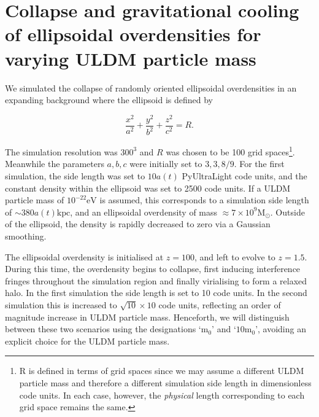 \documentclass[a4paper,11pt]{article}
\begin{document}
\section{Collapse and gravitational cooling of ellipsoidal overdensities for varying ULDM particle mass}\label{sec:collapse}

We simulated the collapse of randomly oriented ellipsoidal overdensities in an expanding background where the ellipsoid is defined by

\begin{equation}\label{eq:ellipse}
    \frac{x^2}{a^2}+\frac{y^2}{b^2}+\frac{z^2}{c^2} = R.
\end{equation}

The simulation resolution was $300^3$ and $R$ was chosen to be 100 grid spaces\footnote{R is defined in terms of grid spaces since we may assume a different ULDM particle mass and therefore a different simulation side length in dimensionless code units. In each case, however, the \textit{physical} length corresponding to each grid space remains the same.}. Meanwhile the parameters ${a, b, c}$ were initially set to ${3,3,8/9}$. For the first simulation, the side length was set to $10a(t)$ {\sc PyUltraLight} code units, and the constant density within the ellipsoid was set to 2500 code units. If a ULDM particle mass of $10^{-22}\mathrm{eV}$ is assumed, this corresponds to a simulation side length of $\sim 380a(t) \mathrm{kpc}$, and an ellipsoidal overdensity of mass $\approx 7\times 10^9 \mathrm{M}_{\odot}$. Outside of the ellipsoid, the density is rapidly decreased to zero via a Gaussian smoothing.

The ellipsoidal overdensity is initialised at $z=100$, and left to evolve to $z=1.5$. During this time, the overdensity begins to collapse, first inducing interference fringes throughout the simulation region and finally virialising to form a relaxed halo. In the first simulation the side length is set to 10 code units. In the second simulation this is increased to $\sqrt{10}\times 10$ code units, reflecting an order of magnitude increase in ULDM particle mass. Henceforth, we will distinguish between these two scenarios using the designations `$\mathrm{m}_0$' and `$10 \mathrm{m}_0$', avoiding an explicit choice for the ULDM particle mass. 
\end{document}
